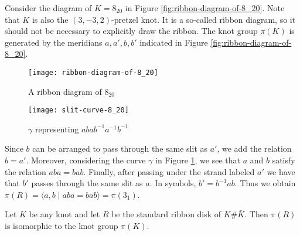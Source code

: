\documentclass[main.tex]{subfiles}
\begin{document}
\begin{example}\label{ex:8-20-ribbon}
Consider the diagram of $K = 8_{20}$ in Figure \ref{fig:ribbon-diagram-of-8_20}. Note that $K$ is also the $(3, -3, 2)$-pretzel knot. It is a so-called ribbon diagram, so it should not be necessary to explicitly draw the ribbon. The knot group $\pi(K)$ is generated by the meridians $a, a', b, b'$ indicated in Figure \ref{fig:ribbon-diagram-of-8_20}.

\begin{figure}[htb]
\centering
\begin{minipage}[b]{0.43\textwidth}
\centering
\texttt{[image: ribbon-diagram-of-8\_20]}
\caption{A ribbon diagram of $8_{20}$}
\label{fig:ribbon-diagram-of-8_20}
\end{minipage}%
\begin{minipage}[b]{0.57\textwidth}
\centering
\texttt{[image: slit-curve-8\_20]}
\caption{$\gamma$ representing $a b a b^{-1} a^{-1} b^{-1}$}
\label{fig:slit-curve-8-20}
\end{minipage}
\end{figure}


Since $b$ can be arranged to pass through the same slit as $a'$, we add the relation $b = a'$. Moreover, considering the curve $\gamma$ in Figure \ref{fig:slit-curve-8-20}, we see that $a$ and $b$ satisfy the relation $aba = bab$. Finally, after passing under the strand labeled $a'$ we have that $b'$ passes through the same slit as $a$. In symbols, $b' = b^{-1}ab$. Thus we obtain $\pi(R) = \langle a, b \; | \; aba = bab \rangle = \pi(3_1)$.
\end{example}



\begin{theorem}\label{thm:pi(K)=pi(R)}
Let $K$ be any knot and let $R$ be the standard ribbon disk of $K\#\bar{K}$. Then $\pi(R)$ is isomorphic to the knot group $\pi(K)$.
\end{theorem}
\end{document}
